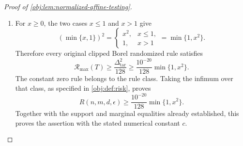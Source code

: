 \begin{proof}[Proof of \cref{obj:lem:normalized-affine-testing}]
\begin{enumerate}
Conditional on the latent table and the channel totals, the records are independent draws from the normalized laws. Thus, on retention, their prefixes have exactly the original two-channel product law, independently of the seed. In particular,
\[
\begin{aligned}
&\mathbb E\left[
(\widetilde T-\tau_\iota)^2\mathbf1_{\mathcal E_{\mathrm{ret}}}
\mid\iota,\boldsymbol\lambda\right]\\
&\qquad=
\Pr(\mathcal E_{\mathrm{ret}}\mid\iota,\boldsymbol\lambda)
\,\mathcal R_{P_\iota(\boldsymbol\lambda)}(T)
\le\mathcal R_{\max}(T).
\end{aligned}
\]
On failure, the output is zero and \(0\le\tau_\iota\le1\), so
\[
\mathbb E\left[
(\widetilde T-\tau_\iota)^2\mathbf1_{\mathcal E_{\mathrm{ret}}^c}
\mid\iota,\boldsymbol\lambda\right]
\le\Pr(\mathcal E_{\mathrm{ret}}^c\mid\iota,\boldsymbol\lambda)
\le\frac{\Delta_{\mathrm{tar}}^2}{128}.
\]
Averaging under either latent prior gives
\[
\mathcal A_\iota(\widetilde T)
\le\mathcal R_{\max}(T)+\frac{\Delta_{\mathrm{tar}}^2}{128}.
\]
Combining this with the raw testing lower bound yields
\[
\frac{\Delta_{\mathrm{tar}}^2}{64}
\le\max_\iota\mathcal A_\iota(\widetilde T)
\le\mathcal R_{\max}(T)+\frac{\Delta_{\mathrm{tar}}^2}{128},
\qquad
\mathcal R_{\max}(T)\ge\frac{\Delta_{\mathrm{tar}}^2}{128}.
\]

\item
For \(x\ge0\), the two cases \(x\le1\) and \(x>1\) give
\[
(\min\{x,1\})^2
=
\begin{cases}
x^2,&x\le1,\\
1,&x>1
\end{cases}
=\min\{1,x^2\}.
\]
Therefore every original clipped Borel randomized rule satisfies
\[
\mathcal R_{\max}(T)
\ge\frac{\Delta_{\mathrm{tar}}^2}{128}
\ge\frac{10^{-20}}{128}\min\{1,x^2\}.
\]
The constant zero rule belongs to the rule class. Taking the infimum over that class, as specified in \cref{obj:def:risk}, proves
\[
R(n,m,d,\epsilon)
\ge\frac{10^{-20}}{128}\min\{1,x^2\}.
\]
Together with the support and marginal equalities already established, this proves the assertion with the stated numerical constant \(c\).
\end{enumerate}
\end{proof}
